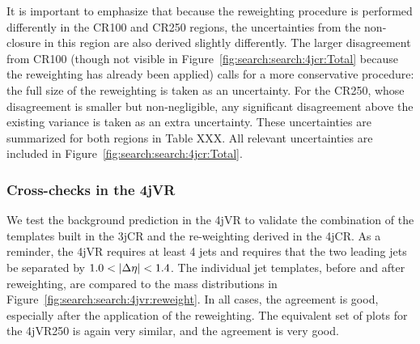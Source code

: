 It is important to emphasize that because the reweighting procedure is performed differently in the CR100 and CR250 regions, the uncertainties from the non-closure in this region are also derived slightly differently. The larger disagreement from CR100 (though not visible in Figure~\ref{fig:search:search:4jcr:Total} because the reweighting has already been applied) calls for a more conservative procedure: the full size of the reweighting is taken as an uncertainty. For the CR250,  whose disagreement is smaller but non-negligible, any significant disagreement above the existing variance is taken as an extra uncertainty. These uncertainties are summarized for both regions in Table XXX. All relevant uncertainties are included in Figure~\ref{fig:search:search:4jcr:Total}.



\subsubsection{Cross-checks in the 4jVR}


We test the background prediction in the 4jVR to validate the combination of the templates built in the 3jCR and the re-weighting derived in the 4jCR. As a reminder, the 4jVR requires at least 4 jets and requires that the two leading jets be separated by $1.0 < |\Delta\eta| < 1.4$. The individual jet templates, before and after reweighting, are compared to the mass distributions in Figure~\ref{fig:search:search:4jvr:reweight}. In all cases, the agreement is good, especially after the application of the reweighting. The equivalent set of plots for the 4jVR250 is again very similar, and the agreement is very good. %

